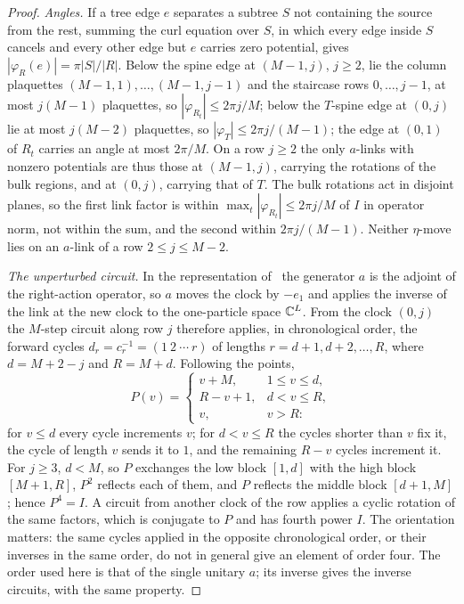\begin{proof}
\emph{Angles.} If a tree edge $e$ separates a subtree $S$ not containing the source from the rest, summing the curl equation over
$S$, in which every edge inside $S$ cancels and every other edge but $e$ carries zero potential, gives $|\varphi_R(e)|=\pi|S|/|R|$.
Below the spine edge at $(M-1,j)$, $j\ge2$, lie the column plaquettes $(M-1,1),\dots,(M-1,j-1)$ and the staircase rows $0,\dots,j-1$, at
most $j(M-1)$ plaquettes, so $|\varphi_{R_t}|\le2\pi j/M$; below the $T$-spine edge at $(0,j)$ lie at most $j(M-2)$ plaquettes, so
$|\varphi_T|\le2\pi j/(M-1)$; the edge at $(0,1)$ of $R_t$ carries an angle at most $2\pi/M$. On a row $j\ge2$ the only $a$-links with
nonzero potentials are thus those at $(M-1,j)$, carrying the rotations of the bulk regions, and at $(0,j)$, carrying that of $T$. The
bulk rotations act in disjoint planes, so the first link factor is within $\max_t|\varphi_{R_t}|\le2\pi j/M$ of $I$ in operator norm,
not within the sum, and the second within $2\pi j/(M-1)$. Neither $\eta$-move lies on an $a$-link of a row $2\le j\le M-2$.

\emph{The unperturbed circuit.} In the representation of~\cite[Section~6.2]{DM-H3} the generator $a$ is the adjoint of the
right-action operator, so $a$ moves the clock by $-e_1$ and applies the inverse of the link at the new clock to the one-particle
space $\mathbb C^L$. From the clock $(0,j)$ the $M$-step circuit along row $j$ therefore applies, in chronological order, the forward cycles
$d_r=c_r^{-1}=(1\ 2\ \cdots\ r)$ of lengths $r=d+1,d+2,\dots,R$, where $d=M+2-j$ and $R=M+d$. Following the points,
\[
P(v)=\begin{cases}v+M,&1\le v\le d,\\ R-v+1,&d<v\le R,\\ v,&v>R:\end{cases}
\]
for $v\le d$ every cycle increments $v$; for $d<v\le R$ the cycles shorter than $v$ fix it, the cycle of length $v$ sends it to $1$, and
the remaining $R-v$ cycles increment it. For $j\ge3$, $d<M$, so $P$ exchanges the low block $[1,d]$ with the high block $[M+1,R]$, $P^2$
reflects each of them, and $P$ reflects the middle block $[d+1,M]$; hence $P^4=I$. A circuit from another clock of the row applies a
cyclic rotation of the same factors, which is conjugate to $P$ and has fourth power $I$. The orientation matters: the same cycles
applied in the opposite chronological order, or their inverses in the same order, do not in general give an element of order
four. The order used here is that of the single unitary $a$; its inverse gives the inverse circuits, with the same property.


\end{proof}
